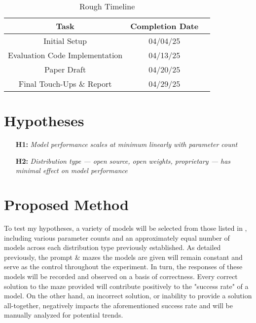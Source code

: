 \documentclass[conference]{IEEEtran}
\begin{document}
\begin{table}[t!]
    \begin{center}
        \begin{tabular}{ |c|c|c| }
            \hline
            \textbf{Task} & \textbf{Completion Date} \\
            \hline
            Initial Setup & 04/04/25\\ 
            \hline
            Evaluation Code Implementation & 04/13/25\\
            \hline
            Paper Draft & 04/20/25 \\
            \hline
            Final Touch-Ups \& Report & 04/29/25\\
            \hline
        \end{tabular}
    \caption{Rough Timeline}
    \label{table:timeline}
    \end{center}
\end{table}

\section{Hypotheses}
\begin{enumerate}
    \item[\textbf{H1:}] \textit{Model performance scales at minimum linearly with parameter count}
    \item[\textbf{H2:}] \textit{Distribution type --- open source, open weights, proprietary --- has minimal effect on model performance}
\end{enumerate}

\section{Proposed Method}
To test my hypotheses, a variety of models will be selected from those listed in \cite{ext4}, including various parameter counts and an approximately equal number of models across each distribution type previously established. As detailed previously, the prompt \& mazes the models are given will remain constant and serve as the control throughout the experiment. In turn, the responses of these models will be recorded and observed on a basis of correctness. Every correct solution to the maze provided will contribute positively to the "success rate" of a model. On the other hand, an incorrect solution, or inability to provide a solution all-together, negatively impacts the aforementioned success rate and will be manually analyzed for potential trends. 
\end{document}
